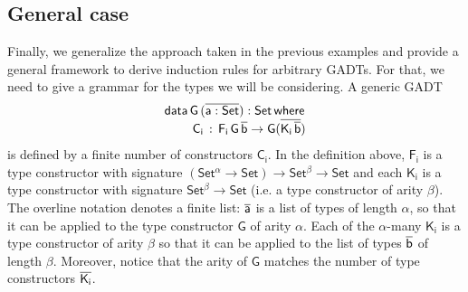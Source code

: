 \documentclass[acmsmall,screen,review,anonymous]{acmart}
\theoremstyle{definition}
\begin{document}



\subsection{General case}


Finally, we generalize the approach taken in the previous examples
and provide a general framework to derive induction rules for arbitrary GADTs.
For that, we need to give a grammar for the types we will be considering.
A generic GADT
\begin{equation*}
\begin{array}{l}
\mathsf{data\, G\,(\overline{a : Set}) : Set\,where}\\
\mathsf{\;\;\;\;\;\;\;\;C_i\, :\, F_i\,G\,\overline{b} \to G (\overline{K_i\,\overline{b}})}
\end{array}
\end{equation*}
is defined by a finite number of constructors $\mathsf{C_i}$.
In the definition above, $\mathsf{F_i}$ is a type constructor with signature $\mathsf{(Set^{\alpha} \to Set) \to Set^{\beta} \to Set}$
and each $\mathsf{K_i}$ is a type constructor with signature $\mathsf{Set^{\beta} \to Set}$
(i.e. a type constructor of arity $\mathsf{\beta}$).
The overline notation denotes a finite list:
$\mathsf{\overline{a}}$ is a list of types of length $\mathsf{\alpha}$,
so that it can be applied to the type constructor $\mathsf{G}$ of arity $\mathsf{\alpha}$.
Each of the $\mathsf{\alpha}$-many $\mathsf{K_i}$ is a type constructor of arity $\mathsf{\beta}$
so that it can be applied to the list of types $\mathsf{\overline{b}}$ of length $\mathsf{\beta}$.
Moreover, notice that the arity of $\mathsf{G}$ matches the number of type constructors $\mathsf{\overline{K_i}}$.
\end{document}
